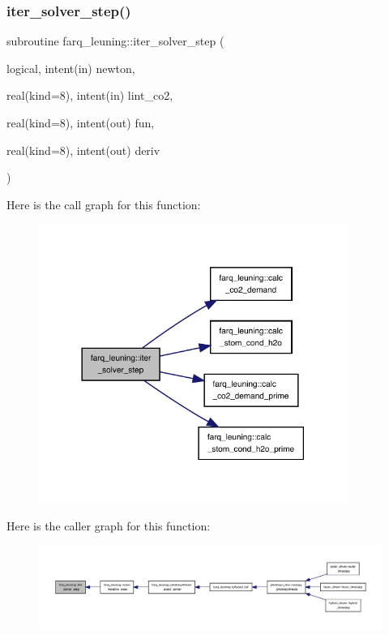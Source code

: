 \subsubsection{\texorpdfstring{iter\+\_\+solver\+\_\+step()}{iter\_solver\_step()}}
{\footnotesize\ttfamily subroutine farq\+\_\+leuning\+::iter\+\_\+solver\+\_\+step (\begin{DoxyParamCaption}\item[{logical, intent(in)}]{newton,  }\item[{real(kind=8), intent(in)}]{lint\+\_\+co2,  }\item[{real(kind=8), intent(out)}]{fun,  }\item[{real(kind=8), intent(out)}]{deriv }\end{DoxyParamCaption})}

Here is the call graph for this function\+:
\nopagebreak
\begin{figure}[H]
\begin{center}
\leavevmode
\includegraphics[width=285pt]{namespacefarq__leuning_a0aaa5d6b54e5a9a9549d2c43bfbecf06_cgraph}
\end{center}
\end{figure}
Here is the caller graph for this function\+:
\nopagebreak
\begin{figure}[H]
\begin{center}
\leavevmode
\includegraphics[width=350pt]{namespacefarq__leuning_a0aaa5d6b54e5a9a9549d2c43bfbecf06_icgraph}
\end{center}
\end{figure}
\mbox{\label{namespacefarq__leuning_afaec87b2ad3c7bf6d33f9f778590317c}} 
